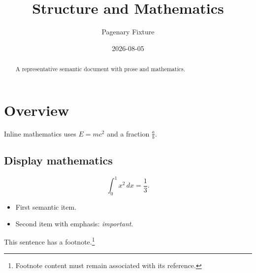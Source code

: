 \documentclass{article}
\title{Structure and Mathematics}
\author{Pagenary Fixture}
\date{2026-08-05}
\begin{document}
\maketitle
\begin{abstract}
A representative semantic document with prose and mathematics.
\end{abstract}

\section{Overview}
Inline mathematics uses $E = mc^2$ and a fraction $\frac{a}{b}$.

\subsection{Display mathematics}
\begin{equation}
  \int_0^1 x^2\,dx = \frac{1}{3}.
\end{equation}

\begin{itemize}
  \item First semantic item.
  \item Second item with emphasis: \emph{important}.
\end{itemize}

This sentence has a footnote.\footnote{Footnote content must remain associated
with its reference.}
\end{document}

